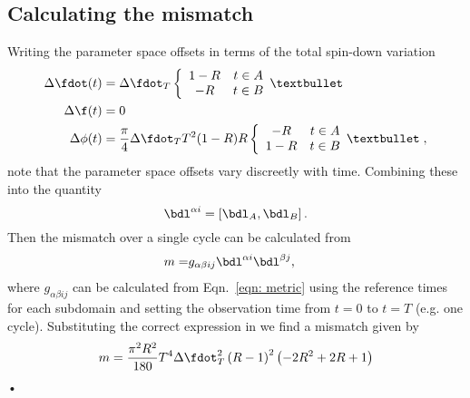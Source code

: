 
\subsection{Calculating the mismatch}
Writing the parameter space offsets in terms of the total spin-down variation
\begin{align}
\Delta\fdot(t) &= \dST\two{1-R}{-R} \\
\Delta\f(t) &= 0  \\
\Delta\phi(t) & = \frac{\pi}{4} \dST T^{2}(1-R)R \two{-R}{1-R},
\label{eqn: Lyne parameter space offsets}
\end{align}
note that the parameter space offsets vary discreetly with time. Combining
these into the quantity 
\begin{equation}
\bdl^{\alpha i} = \left[\bdl_{A}, \bdl_{B}\right].
\end{equation}
Then the mismatch over a single cycle can be calculated from
\begin{align}
m = & g_{\alpha\beta ij}\bdl^{\alpha i} \bdl^{\beta j},
\end{align}
where $g_{\alpha\beta i j}$ can be calculated from Eqn.~\eqref{eqn: metric}
using the reference times for each subdomain and setting the observation time
from $t=0$ to $t=T$ (e.g. one cycle). Substituting the correct expression in we find a mismatch given by
\begin{equation}
m = \frac{\pi^{2} R^{2}}{180} T^{4} \dST^{2} \left(R - 1\right)^{2} 
    \left(-2 R^{2} + 2 R + 1\right)
\label{eqn: mismatch lyne single switch}
\end{equation}•


